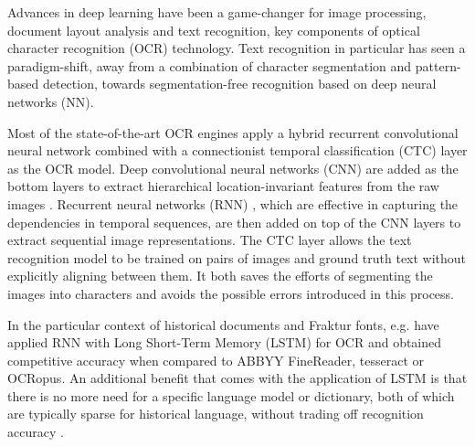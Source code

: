 \documentclass[sigconf]{acmart}
\begin{document}
Advances in deep learning have been a game-changer for image
processing, document layout analysis and text recognition, key components of optical
character recognition (OCR) technology. Text recognition in
particular has seen a paradigm-shift, away from a combination of character
segmentation and pattern-based detection, towards
segmentation-free recognition based on deep neural networks (NN).

Most of the state-of-the-art OCR engines apply a hybrid recurrent convolutional
neural network combined with a connectionist temporal classification (CTC)
\cite{graves2006connectionist} layer as the OCR model. Deep convolutional
neural networks (CNN) \cite{krizhevsky2012imagenet} are added as the bottom
layers to extract hierarchical location-invariant features from the raw images
\cite{wick2018improving}. Recurrent neural networks (RNN)
\cite{mikolov2010recurrent}, which are effective in capturing the dependencies
in temporal sequences, are then added on top of the CNN layers to extract
sequential image representations. The CTC layer allows the text recognition
model to be trained on pairs of images and ground truth text without explicitly
aligning between them. It both saves the efforts of segmenting the images into
characters and avoids the possible errors introduced in this process.

In the particular context of historical documents and Fraktur fonts, e.g.
\cite{breuel2013high} have applied RNN with Long Short-Term Memory (LSTM) for OCR and obtained 
competitive accuracy when compared to ABBYY FineReader, tesseract or OCRopus. 
An additional benefit that comes with the application of LSTM is that there is
no more need for a specific language model or dictionary, both of which are 
typically sparse for historical language, without trading off recognition accuracy \cite{ul2013can}.
\end{document}
